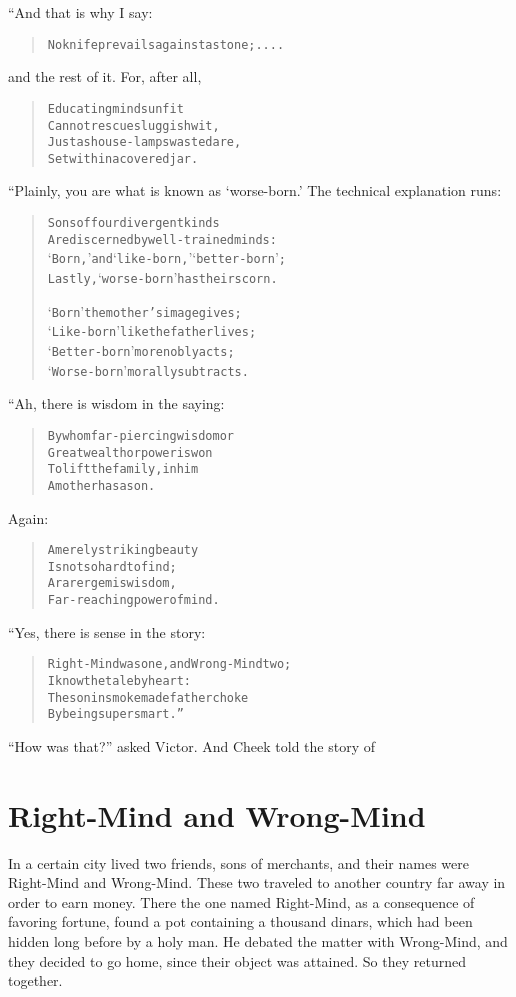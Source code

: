 \documentclass[article, twoside, 14pt]{memoir}
\renewenvironment{verbatim}{%
\begin{quote}%
\vskip -10pt%
\begin{alltt}\normalfont\large}{\end{alltt}%
\end{quote}%
\vskip -10pt
} %
\begin{document}
“And that is why I say:

\begin{verbatim}
No knife prevails against a stone; ....
\end{verbatim}
and the rest of it. For, after all,

\begin{verbatim}
Educating minds unfit
Cannot rescue sluggish wit,
Just as house-lamps wasted are,
Set within a covered jar.
\end{verbatim}
“Plainly, you are what is known as `worse-born.' The technical
explanation runs:

\begin{verbatim}
Sons of four divergent kinds
Are discerned by well-trained minds:
‘Born,’ and ‘like-born,’ ‘better-born’;
Lastly, ‘worse-born’ has their scorn.

‘Born’ the mother's image gives;
‘Like-born’ like the father lives;
‘Better-born’ more nobly acts;
‘Worse-born’ morally subtracts.
\end{verbatim}
“Ah, there is wisdom in the saying:

\begin{verbatim}
By whom far-piercing wisdom or
    Great wealth or power is won
To lift the family, in him
    A mother has a son.
\end{verbatim}
Again:

\begin{verbatim}
A merely striking beauty
    Is not so hard to find;
A rarer gem is wisdom,
    Far-reaching power of mind.
\end{verbatim}
“Yes, there is sense in the story:

\begin{verbatim}
Right-Mind was one, and Wrong-Mind two;
    I know the tale by heart:
The son in smoke made father choke
    By being supersmart.”
\end{verbatim}
``How was that?'' asked Victor. And Cheek told the story of

\chapter{Right-Mind and Wrong-Mind}

\label{s29}

In a certain city lived two friends, sons of merchants, and their
names were Right-Mind and Wrong-Mind. These two traveled to another
country far away in order to earn money. There the one named
Right-Mind, as a consequence of favoring fortune, found a pot
containing a thousand dinars, which had been hidden long before by
a holy man. He debated the matter with Wrong-Mind, and they decided
to go home, since their object was attained. So they returned
together.
\end{document}
